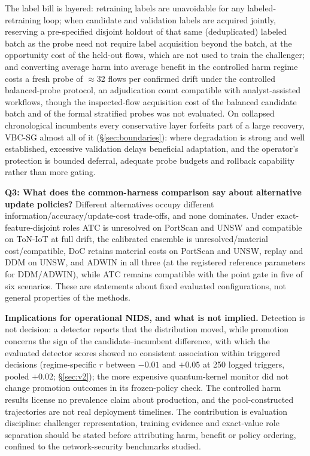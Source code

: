 \documentclass[journal]{IEEEtran}
\begin{document}
The label bill is layered: retraining labels are unavoidable for any labeled-retraining loop; when candidate and validation labels are acquired jointly, reserving a pre-specified disjoint holdout of that same (deduplicated) labeled batch as the probe need not require label acquisition beyond the batch, at the opportunity cost of the held-out flows, which are not used to train the challenger; and converting average harm into average benefit in the controlled harm regime costs a fresh probe of $\approx$32 flows per confirmed drift under the controlled balanced-probe protocol, an adjudication count compatible with analyst-assisted workflows, though the inspected-flow acquisition cost of the balanced candidate batch and of the formal stratified probes was not evaluated. On collapsed chronological incumbents every conservative layer forfeits part of a large recovery, VBC-SG almost all of it (\S\ref{sec:boundaries}): where degradation is strong and well established, excessive validation delays beneficial adaptation, and the operator's protection is bounded deferral, adequate probe budgets and rollback capability rather than more gating.

\textbf{Q3: What does the common-harness comparison say about alternative update policies?} Different alternatives occupy different information/accuracy/update-cost trade-offs, and none dominates. Under exact-feature-disjoint roles ATC is unresolved on PortScan and UNSW and compatible on ToN-IoT at full drift, the calibrated ensemble is unresolved/material cost/compatible, DoC retains material costs on PortScan and UNSW, replay and DDM on UNSW, and ADWIN in all three (at the registered reference parameters for DDM/ADWIN), while ATC remains compatible with the point gate in five of six scenarios. These are statements about fixed evaluated configurations, not general properties of the methods.

\textbf{Implications for operational NIDS, and what is not implied.} Detection is not decision: a detector reports that the distribution moved, while promotion concerns the sign of the candidate--incumbent difference, with which the evaluated detector scores showed no consistent association within triggered decisions (regime-specific $r$ between $-0.01$ and $+0.05$ at 250 logged triggers, pooled $+0.02$; \S\ref{sec:v2}); the more expensive quantum-kernel monitor did not change promotion outcomes in its frozen-policy check. The controlled harm results license no prevalence claim about production, and the pool-constructed trajectories are not real deployment timelines. The contribution is evaluation discipline: challenger representation, training evidence and exact-value role separation should be stated before attributing harm, benefit or policy ordering, confined to the network-security benchmarks studied.
\end{document}
